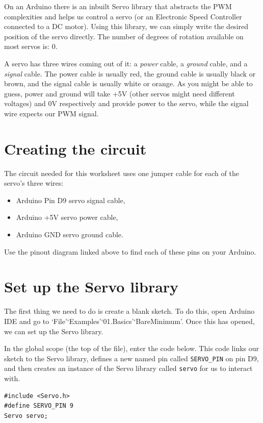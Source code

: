 \documentclass[11pt,a4paper]{article}
\begin{document}
On an Arduino there is an inbuilt Servo library that abstracts the PWM complexities and helps us control a servo (or an Electronic Speed Controller connected to a DC motor). Using this library, we can simply write the desired position of the servo directly. The number of degrees of rotation available on most servos is: 0.

A servo has three wires coming out of it: a \textit{power} cable, a \textit{ground} cable, and a \textit{signal} cable. The power cable is usually red, the ground cable is usually black or brown, and the signal cable is usually white or orange. As you might be able to guess, power and ground will take +5V (other servos might need different voltages) and 0V respectively and provide power to the servo, while the signal wire expects our PWM signal.

\section{Creating the circuit}
The circuit needed for this worksheet uses one jumper cable for each of the servo's three wires:
\begin{itemize}
    \item Arduino Pin D9 \textrightarrow{} servo signal cable,
    \item Arduino +5V \textrightarrow{} servo power cable,
    \item Arduino GND \textrightarrow{} servo ground cable.
\end{itemize}
Use the pinout diagram linked above to find each of these pins on your Arduino.

\section{Set up the Servo library}
The first thing we need to do is create a blank sketch. To do this, open Arduino IDE and go to `File'\textrightarrow `Examples'\textrightarrow `01.Basics'\textrightarrow `BareMinimum'. Once this has opened, we can set up the Servo library.

In the global scope (the top of the file), enter the code below. This code links our sketch to the Servo library, defines a new named pin called \verb|SERVO_PIN| on pin D9, and then creates an instance of the Servo library called \verb|servo| for us to interact with.
\begin{verbatim}
#include <Servo.h>
#define SERVO_PIN 9
Servo servo;
\end{verbatim}
\end{document}
